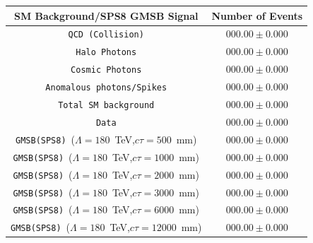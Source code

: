 \begin{center}
\centering
\begin{tabular}{c c}
\hline
\bfseries{SM Background/SPS8 GMSB Signal} & \bfseries {Number of Events}\\
\hline
\texttt{QCD~(Collision)}  & $000.00 \pm 0.000$\\
\texttt{Halo Photons}  & $000.00 \pm 0.000$ \\
\texttt{Cosmic Photons} & $000.00 \pm 0.000$ \\
\texttt{Anomalous photons/Spikes} & $000.00 \pm 0.000$\\
\texttt{Total SM background} & $000.00 \pm 0.000$ \\
\hline \hline
\texttt{Data} & $000.00 \pm 0.000$ \\
\hline 
\texttt{GMSB(SPS8)}~($\Lambda=180$~TeV,$c\tau=500$~mm) & $000.00 \pm 0.000$ \\
\texttt{GMSB(SPS8)}~($\Lambda=180$~TeV,$c\tau=1000$~mm) & $000.00 \pm 0.000$ \\
\texttt{GMSB(SPS8)}~($\Lambda=180$~TeV,$c\tau=2000$~mm) & $000.00 \pm 0.000$ \\
\texttt{GMSB(SPS8)}~($\Lambda=180$~TeV,$c\tau=3000$~mm) & $000.00 \pm 0.000$ \\
\texttt{GMSB(SPS8)}~($\Lambda=180$~TeV,$c\tau=6000$~mm) & $000.00 \pm 0.000$ \\
\texttt{GMSB(SPS8)}~($\Lambda=180$~TeV,$c\tau=12000$~mm) & $000.00 \pm 0.000$ \\
\hline \hline
\end{tabular}
\label{tab:RESULT}
\end{center}



